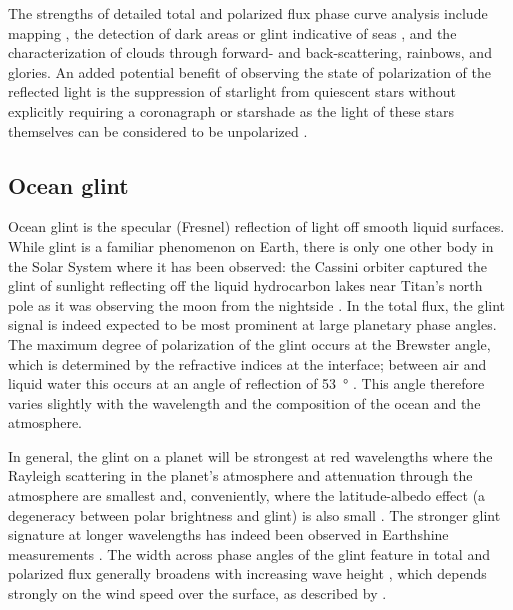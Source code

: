 \documentclass[
    usenatbib,
]{mnras}
\begin{document}
The strengths of detailed total and polarized flux phase curve analysis include mapping \citep{2001Natur.412..885F, berdyugina2019surface, 2022A&A...664A..59M}, the detection of dark areas or glint indicative of seas \citep{groot2020, cowan2008inverting, lustig2019}, and the characterization of clouds through forward- and back-scattering, rainbows, and glories.
%
An added potential benefit of observing the state of polarization of the reflected light is the suppression of starlight from quiescent stars without explicitly requiring a coronagraph or starshade as the light of these stars themselves can be considered to be unpolarized \citep{kemp1987}.


\subsection{Ocean glint}

Ocean glint is the specular (Fresnel) reflection of light off smooth liquid surfaces. While glint is a familiar phenomenon on Earth, there is only
one other body in the Solar System where it has been observed: 
the Cassini orbiter captured the glint of sunlight reflecting off the
liquid hydrocarbon lakes near Titan's north pole as it was observing
the moon from the nightside \citep{2010GeoRL..37.7104S}.
%
In the total flux, the glint signal is indeed expected to be most prominent at large planetary phase angles.
%
The maximum degree of polarization of the glint occurs at the Brewster angle, which is determined by the refractive indices at the interface; between air and liquid water this occurs at an angle of reflection of \qty{53}{\degree} \citep[i.e., at a planetary phase angle of \qty{106}{\degree}; see, e.g.,][]{Zugger_2010,treesandstam2019}.
%
This angle therefore varies slightly with the wavelength and the composition of the ocean and the atmosphere.
%

In general, the glint on a planet will be strongest at red wavelengths where the Rayleigh scattering in the planet's atmosphere and attenuation through the atmosphere are smallest \citep{Zugger_2011} and, conveniently, where the latitude-albedo effect (a degeneracy between polar brightness and glint) is also small \citep{2012ApJ...752L...3C}.
%
The stronger glint signature at longer wavelengths has indeed been observed in Earthshine measurements \citep{Emde2017,sterzik2019, takahashi2021}.
%
The width across phase angles of the glint feature in total and polarized flux generally
broadens with increasing wave height \citep{kopparla2018, Zugger_2010, treesandstam2019, trees2022}, which depends strongly on the wind speed over the surface, as described by \citet{CoxMunk1954}.
%
\end{document}

